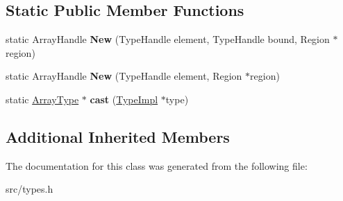 \subsection*{Static Public Member Functions}
\begin{DoxyCompactItemize}
\item 
\hypertarget{classv8_1_1internal_1_1_type_impl_1_1_array_type_a49f031f505e5a6305d17fb0a9a2e0e80}{}static Array\+Handle {\bfseries New} (Type\+Handle element, Type\+Handle bound, Region $\ast$region)\label{classv8_1_1internal_1_1_type_impl_1_1_array_type_a49f031f505e5a6305d17fb0a9a2e0e80}

\item 
\hypertarget{classv8_1_1internal_1_1_type_impl_1_1_array_type_acea9c7a04d6c7e4be5599f73488c4a29}{}static Array\+Handle {\bfseries New} (Type\+Handle element, Region $\ast$region)\label{classv8_1_1internal_1_1_type_impl_1_1_array_type_acea9c7a04d6c7e4be5599f73488c4a29}

\item 
\hypertarget{classv8_1_1internal_1_1_type_impl_1_1_array_type_a8c1acef02cb705804eacb69591356c04}{}static \hyperlink{classv8_1_1internal_1_1_type_impl_1_1_array_type}{Array\+Type} $\ast$ {\bfseries cast} (\hyperlink{classv8_1_1internal_1_1_type_impl}{Type\+Impl} $\ast$type)\label{classv8_1_1internal_1_1_type_impl_1_1_array_type_a8c1acef02cb705804eacb69591356c04}

\end{DoxyCompactItemize}
\subsection*{Additional Inherited Members}


The documentation for this class was generated from the following file\+:\begin{DoxyCompactItemize}
\item 
src/types.\+h\end{DoxyCompactItemize}
